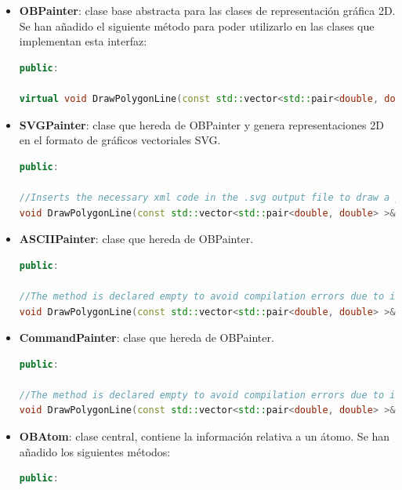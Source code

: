 \begin{itemize}
    \item \textbf{OBPainter}: clase base abstracta para las clases de representación gráfica 2D. Se han añadido el siguiente método para poder utilizarlo en las clases que implementan esta interfaz:
    \begin{lstlisting}[language=C++]
        public: 
    
virtual void DrawPolygonLine(const std::vector<std::pair<double, double> >& points) = 0;
    \end{lstlisting}

    \item \textbf{SVGPainter}: clase que hereda de OBPainter y genera representaciones 2D en el formato de gráficos vectoriales SVG.
    \begin{lstlisting}[language=C++]
        public: 
    
//Inserts the necessary xml code in the .svg output file to draw a polygon according to the vector of points specified by @p points
void DrawPolygonLine(const std::vector<std::pair<double, double> >& points);
    \end{lstlisting}

    \item \textbf{ASCIIPainter}: clase que hereda de OBPainter.
    \begin{lstlisting}[language=C++]
        public: 
    
//The method is declared empty to avoid compilation errors due to interface implementation. It has no use 
void DrawPolygonLine(const std::vector<std::pair<double, double> >& points);
    \end{lstlisting}

    \item \textbf{CommandPainter}: clase que hereda de OBPainter.
    \begin{lstlisting}[language=C++]
        public: 
    
//The method is declared empty to avoid compilation errors due to interface implementation. It has no use 
void DrawPolygonLine(const std::vector<std::pair<double, double> >& points);
    \end{lstlisting}

    \item \textbf{OBAtom}: clase central, contiene la información relativa a un átomo. Se han añadido los siguientes métodos:
    \begin{lstlisting}[language=C++]
    public: 
    

\end{lstlisting}
\end{itemize}
